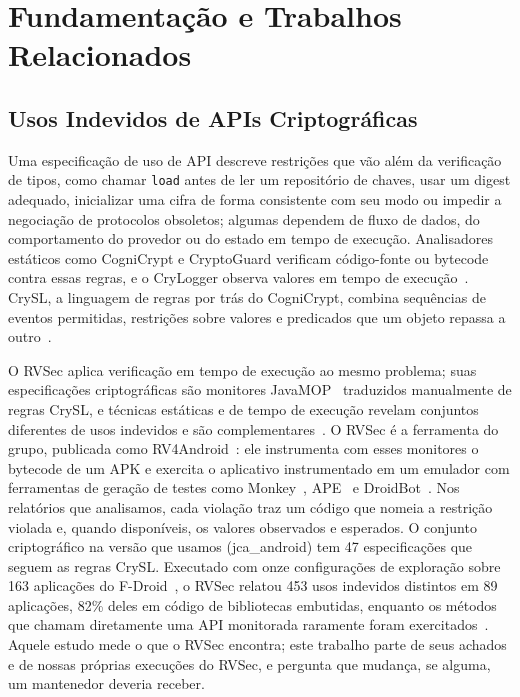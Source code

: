 \documentclass[conference]{IEEEtran}
\begin{document}
\section{Fundamentação e Trabalhos Relacionados}
\label{sec:background}

\subsection{Usos Indevidos de APIs Criptográficas}

Uma especificação de uso de API descreve restrições que vão além da verificação
de tipos, como chamar \texttt{load} antes de ler um repositório de chaves, usar
um digest adequado, inicializar uma cifra de forma consistente com seu modo ou
impedir a negociação de protocolos obsoletos; algumas dependem de fluxo de
dados, do comportamento do provedor ou do estado em tempo de execução.
Analisadores estáticos como CogniCrypt
e CryptoGuard verificam código-fonte ou bytecode contra essas regras, e o
CryLogger observa valores em tempo de
execução~\cite{krueger2017cognicrypt,rahaman2019cryptoguard,piccolboni2021crylogger}.
CrySL, a linguagem de regras por trás do CogniCrypt, combina sequências de
eventos permitidas, restrições sobre valores e predicados que um objeto repassa
a outro~\cite{krueger2021crysl}.

O RVSec aplica verificação em tempo de execução ao mesmo problema; suas
especificações criptográficas são monitores JavaMOP~\cite{jin2012javamop}
traduzidos manualmente de regras CrySL, e técnicas estáticas e de tempo de
execução revelam conjuntos diferentes de usos indevidos e são
complementares~\cite{torres2023runtime}. O RVSec é a ferramenta do grupo,
publicada como RV4Android~\cite{costa2026rv4android}: ele instrumenta com esses
monitores o bytecode de um APK e exercita o aplicativo instrumentado em um
emulador com ferramentas de geração de testes como Monkey~\cite{androidmonkey},
APE~\cite{gu2019ape} e DroidBot~\cite{li2017droidbot}. Nos relatórios que
analisamos, cada violação traz um código que nomeia a restrição violada e,
quando disponíveis, os valores observados e esperados. O conjunto criptográfico
na versão que usamos (jca\_android) tem 47 especificações que seguem as regras
CrySL. Executado com onze configurações de exploração sobre 163 aplicações
do F-Droid~\cite{fdroid}, o RVSec relatou 453 usos indevidos distintos em 89 aplicações, 82\% deles
em código de bibliotecas embutidas, enquanto os métodos que chamam diretamente uma
API monitorada raramente foram exercitados~\cite{costa2026effectiveness}. Aquele
estudo mede o que o RVSec encontra; este trabalho parte de seus achados e de nossas
próprias execuções do RVSec, e pergunta que mudança, se alguma, um mantenedor
deveria receber.
\end{document}
